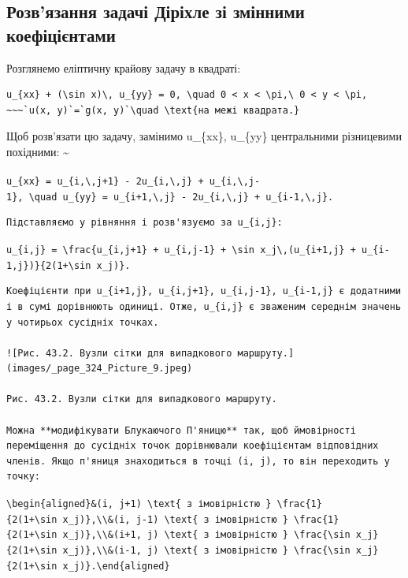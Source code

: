 \documentclass[
  ukrainian,
]{article}
\begin{document}
\subsection{Розв'язання задачі Діріхле зі змінними
коефіцієнтами}\label{ux440ux43eux437ux432ux44fux437ux430ux43dux43dux44f-ux437ux430ux434ux430ux447ux456-ux434ux456ux440ux456ux445ux43bux435-ux437ux456-ux437ux43cux456ux43dux43dux438ux43cux438-ux43aux43eux435ux444ux456ux446ux456ux454ux43dux442ux430ux43cux438}

Розглянемо еліптичну крайову задачу в квадраті:

\begin{verbatim}
u_{xx} + (\sin x)\, u_{yy} = 0, \quad 0 < x < \pi,\ 0 < y < \pi,
~~~`u(x, y)`=`g(x, y)`\quad \text{на межі квадрата.}
\end{verbatim}

Щоб розв'язати цю задачу, замінимо u\_\{xx\}, u\_\{yy\} центральними
різницевими похідними: \textsubscript{}\textasciitilde{}

\texttt{u\_\{xx\}\ =\ u\_\{i,\textbackslash{},j+1\}\ -\ 2u\_\{i,\textbackslash{},j\}\ +\ u\_\{i,\textbackslash{},j-1\},\ \textbackslash{}quad\ u\_\{yy\}\ =\ u\_\{i+1,\textbackslash{},j\}\ -\ 2u\_\{i,\textbackslash{},j\}\ +\ u\_\{i-1,\textbackslash{},j\}.}

\begin{verbatim}
Підставляємо у рівняння і розв'язуємо за u_{i,j}:
\end{verbatim}

\texttt{u\_\{i,j\}\ =\ \textbackslash{}frac\{u\_\{i,j+1\}\ +\ u\_\{i,j-1\}\ +\ \textbackslash{}sin\ x\_j\textbackslash{},(u\_\{i+1,j\}\ +\ u\_\{i-1,j\})\}\{2(1+\textbackslash{}sin\ x\_j)\}.}

\begin{verbatim}
Коефіцієнти при u_{i+1,j}, u_{i,j+1}, u_{i,j-1}, u_{i-1,j} є додатними і в сумі дорівнюють одиниці. Отже, u_{i,j} є зваженим середнім значень у чотирьох сусідніх точках.

![Рис. 43.2. Вузли сітки для випадкового маршруту.](images/_page_324_Picture_9.jpeg)

Рис. 43.2. Вузли сітки для випадкового маршруту.

Можна **модифікувати Блукаючого П'яницю** так, щоб ймовірності переміщення до сусідніх точок дорівнювали коефіцієнтам відповідних членів. Якщо п'яниця знаходиться в точці (i, j), то він переходить у точку:
\end{verbatim}

\texttt{\textbackslash{}begin\{aligned\}\&(i,\ j+1)\ \textbackslash{}text\{\ з\ імовірністю\ \}\ \textbackslash{}frac\{1\}\{2(1+\textbackslash{}sin\ x\_j)\},\textbackslash{}\textbackslash{}\&(i,\ j-1)\ \textbackslash{}text\{\ з\ імовірністю\ \}\ \textbackslash{}frac\{1\}\{2(1+\textbackslash{}sin\ x\_j)\},\textbackslash{}\textbackslash{}\&(i+1,\ j)\ \textbackslash{}text\{\ з\ імовірністю\ \}\ \textbackslash{}frac\{\textbackslash{}sin\ x\_j\}\{2(1+\textbackslash{}sin\ x\_j)\},\textbackslash{}\textbackslash{}\&(i-1,\ j)\ \textbackslash{}text\{\ з\ імовірністю\ \}\ \textbackslash{}frac\{\textbackslash{}sin\ x\_j\}\{2(1+\textbackslash{}sin\ x\_j)\}.\textbackslash{}end\{aligned\}}
\end{document}
